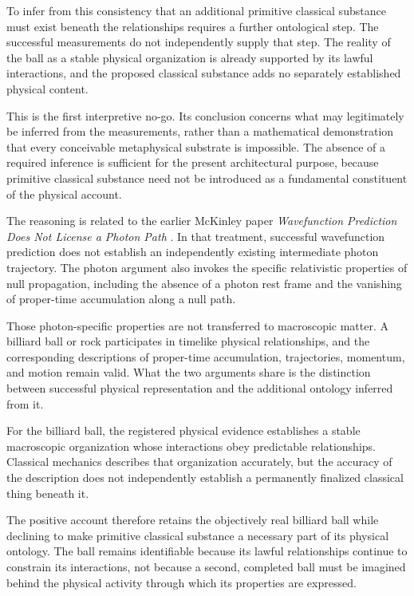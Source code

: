 \documentclass[12pt,onecolumn]{article}
\begin{document}
To infer from this consistency that an additional primitive classical substance must exist beneath the relationships requires a further ontological step. The successful measurements do not independently supply that step. The reality of the ball as a stable physical organization is already supported by its lawful interactions, and the proposed classical substance adds no separately established physical content.

This is the first interpretive no-go. Its conclusion concerns what may legitimately be inferred from the measurements, rather than a mathematical demonstration that every conceivable metaphysical substrate is impossible. The absence of a required inference is sufficient for the present architectural purpose, because primitive classical substance need not be introduced as a fundamental constituent of the physical account.

The reasoning is related to the earlier McKinley paper \textit{Wavefunction Prediction Does Not License a Photon Path} \cite{WavefunctionNoGo2026}. In that treatment, successful wavefunction prediction does not establish an independently existing intermediate photon trajectory. The photon argument also invokes the specific relativistic properties of null propagation, including the absence of a photon rest frame and the vanishing of proper-time accumulation along a null path.

Those photon-specific properties are not transferred to macroscopic matter. A billiard ball or rock participates in timelike physical relationships, and the corresponding descriptions of proper-time accumulation, trajectories, momentum, and motion remain valid. What the two arguments share is the distinction between successful physical representation and the additional ontology inferred from it.

For the billiard ball, the registered physical evidence establishes a stable macroscopic organization whose interactions obey predictable relationships. Classical mechanics describes that organization accurately, but the accuracy of the description does not independently establish a permanently finalized classical thing beneath it.

The positive account therefore retains the objectively real billiard ball while declining to make primitive classical substance a necessary part of its physical ontology. The ball remains identifiable because its lawful relationships continue to constrain its interactions, not because a second, completed ball must be imagined behind the physical activity through which its properties are expressed.
\end{document}
